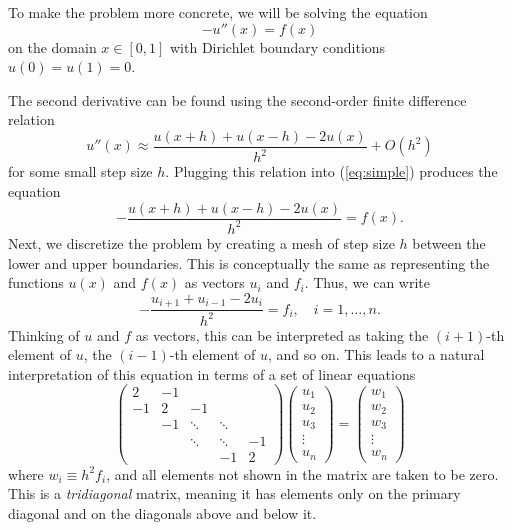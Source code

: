 \documentclass{article}
\begin{document}
    To make the problem more concrete, we will be solving the equation
    \begin{equation}
        -u''(x) = f(x)  \label{eq:simple}
    \end{equation}
    on the domain $x \in [0, 1]$ with Dirichlet boundary conditions $u(0) = u(1) = 0$.

    The second derivative can be found using the second-order finite difference relation
    \begin{equation}
        u''(x) \approx \frac{u(x+h) + u(x-h) - 2u(x)}{h^2} + O(h^2)  \label{eq:finite}
    \end{equation}
    for some small step size $h$. Plugging this relation into (\ref{eq:simple}) produces the equation
    \begin{equation}
        -\frac{u(x+h) + u(x-h) - 2u(x)}{h^2} = f(x).
    \end{equation}
    Next, we discretize the problem by creating a mesh of step size $h$ between the lower and upper boundaries. This is conceptually the same as representing the functions $u(x)$ and $f(x)$ as vectors $u_i$ and $f_i$. Thus, we can write
    \begin{equation}
        -\frac{u_{i+1} + u_{i-1} - 2u_i}{h^2} = f_i, \quad i = 1, \dots, n.
    \end{equation}
    Thinking of $u$ and $f$ as vectors, this can be interpreted as taking the $(i+1)$-th element of $u$, the $(i-1)$-th element of $u$, and so on. This leads to a natural interpretation of this equation in terms of a set of linear equations
    \begin{equation}
        \begin{pmatrix}
             2 & -1 &        &        &    \\
            -1 &  2 & -1     &        &    \\
               & -1 & \ddots & \ddots &    \\
               &    & \ddots & \ddots & -1 \\
               &    &        & -1     &  2
        \end{pmatrix}
        \begin{pmatrix}
            u_1 \\ u_2 \\ u_3 \\ \vdots \\ u_n
        \end{pmatrix}
        =
        \begin{pmatrix}
            w_1 \\ w_2 \\ w_3 \\ \vdots \\ w_n
        \end{pmatrix}
    \end{equation}
    where $w_i \equiv h^2 f_i$, and all elements not shown in the matrix are taken to be zero. This is a \emph{tridiagonal} matrix, meaning it has elements only on the primary diagonal and on the diagonals above and below it.


        
\end{document}
